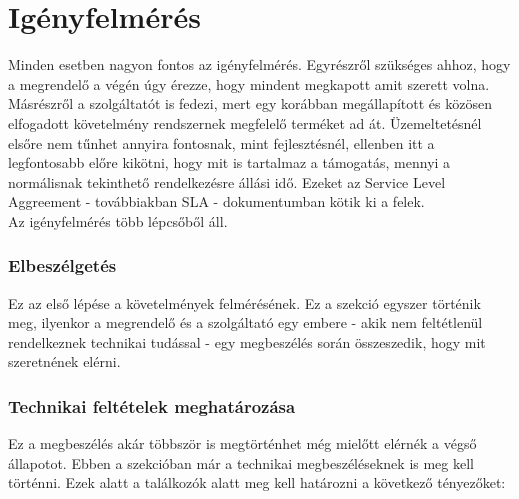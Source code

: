 \documentclass[12pt,oneside,justify,table]{book}
\begin{document}
\section{Igényfelmérés}
Minden esetben nagyon fontos az igényfelmérés. Egyrészről szükséges ahhoz, hogy a megrendelő a végén úgy érezze, hogy mindent megkapott amit szerett volna. Másrészről a szolgáltatót is fedezi, mert egy korábban megállapított és közösen elfogadott követelmény rendszernek megfelelő terméket ad át. Üzemeltetésnél elsőre nem tűnhet annyira fontosnak, mint fejlesztésnél, ellenben itt a legfontosabb előre kikötni, hogy mit is tartalmaz a támogatás, mennyi a normálisnak tekinthető rendelkezésre állási idő. Ezeket az Service Level Aggreement - továbbiakban SLA - dokumentumban kötik ki a felek. \\
Az igényfelmérés több lépcsőből áll. 
\subsubsection{Elbeszélgetés}
Ez az első lépése a követelmények felmérésének. Ez a szekció egyszer történik meg, ilyenkor a megrendelő és a szolgáltató egy embere - akik nem feltétlenül rendelkeznek technikai tudással - egy megbeszélés során összeszedik, hogy mit szeretnének elérni. 

\subsubsection{Technikai feltételek meghatározása}
Ez a megbeszélés akár többször is megtörténhet még mielőtt elérnék a végső állapotot. Ebben a szekcióban már a technikai megbeszéléseknek is meg kell történni. Ezek alatt a találkozók alatt meg kell határozni a következő tényezőket:
\end{document}
